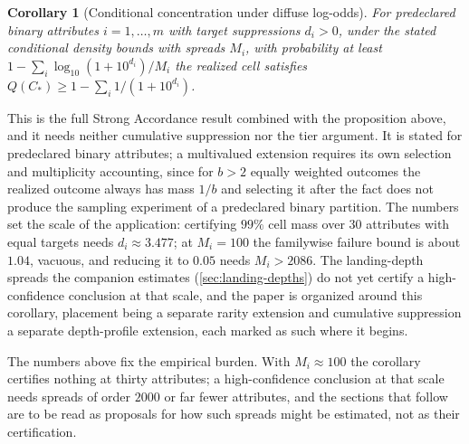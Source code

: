 \documentclass[11pt]{article}
\newtheorem{corollary}{Corollary}
\theoremstyle{definition}
\begin{document}
\begin{corollary}[Conditional concentration under diffuse log-odds]\label{cor:conditional-concentration}
For predeclared binary attributes $i = 1, \ldots, m$ with target suppressions $d_i > 0$, under the stated conditional density bounds with spreads $M_i$, with probability at least $1 - \sum_i \log_{10}(1 + 10^{d_i}) / M_i$ the realized cell satisfies $Q(C_\ast) \ge 1 - \sum_i 1 / (1 + 10^{d_i})$.
\end{corollary}

\noindent This is the full Strong Accordance result combined with the proposition above, and it needs neither cumulative suppression nor the tier argument. It is stated for predeclared binary attributes; a multivalued extension requires its own selection and multiplicity accounting, since for $b > 2$ equally weighted outcomes the realized outcome always has mass $1/b$ and selecting it after the fact does not produce the sampling experiment of a predeclared binary partition. The numbers set the scale of the application: certifying $99\%$ cell mass over $30$ attributes with equal targets needs $d_i \approx 3.477$; at $M_i = 100$ the familywise failure bound is about $1.04$, vacuous, and reducing it to $0.05$ needs $M_i > 2086$. The landing-depth spreads the companion estimates (\autoref{sec:landing-depths}) do not yet certify a high-confidence conclusion at that scale, and the paper is organized around this corollary, placement being a separate rarity extension and cumulative suppression a separate depth-profile extension, each marked as such where it begins.

\noindent The numbers above fix the empirical burden. With $M_i \approx 100$ the corollary certifies nothing at thirty attributes; a high-confidence conclusion at that scale needs spreads of order $2000$ or far fewer attributes, and the sections that follow are to be read as proposals for how such spreads might be estimated, not as their certification.
\end{document}
